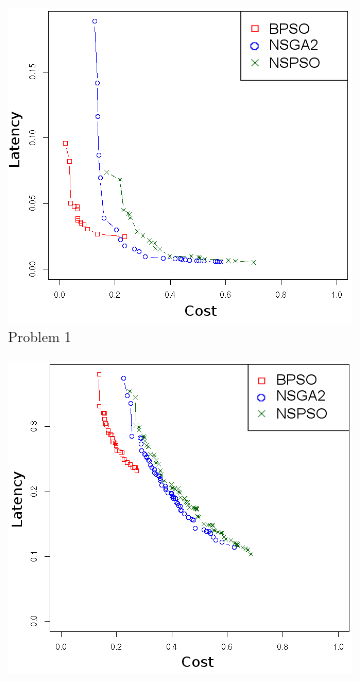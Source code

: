 \begin{figure}[t]
  \caption{NSPSO, NSGA-II and BPSO Experiments: Solutions from Problems 1 $\sim$ 14}
   \centering
   \begin{subfigure}{0.30\textwidth}
       \includegraphics[width=\textwidth]{pics/nsgabpso1.png}
	   \caption{Problem 1}
   \end{subfigure}
   \begin{subfigure}{0.30\textwidth}
       \includegraphics[width=\textwidth]{pics/nsgabpso2.png}

\end{subfigure}
\end{figure}
